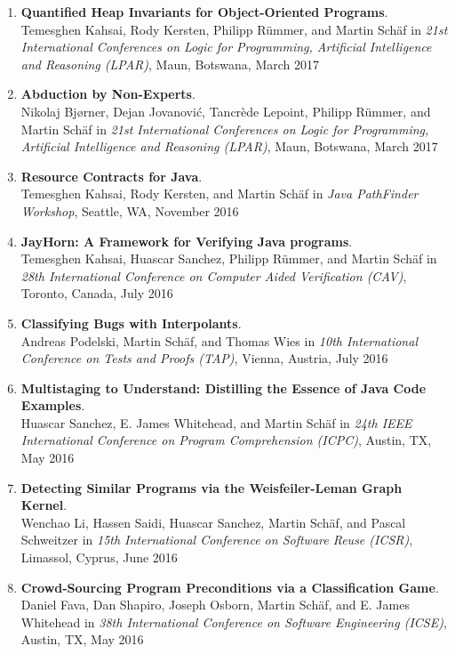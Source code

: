 \begin{enumerate}
\item \textbf{Quantified Heap Invariants for Object-Oriented Programs}.
\\ Temesghen Kahsai, Rody Kersten, Philipp R\"ummer, and Martin Sch\"af in 
\emph{21st International Conferences on Logic for Programming, Artificial Intelligence and Reasoning (LPAR)},
Maun, Botswana, March 2017

\item \textbf{Abduction by Non-Experts}.
\\ Nikolaj Bj{\o}rner, Dejan Jovanovi\'c, Tancr\`ede Lepoint, Philipp R\"ummer, and Martin Sch\"af in 
\emph{21st International Conferences on Logic for Programming, Artificial Intelligence and Reasoning (LPAR)},
Maun, Botswana, March 2017


\item \textbf{Resource Contracts for Java}.
\\ Temesghen Kahsai, Rody Kersten, and Martin Sch\"af in 
\emph{Java PathFinder Workshop},
Seattle, WA, November 2016

\item \textbf{JayHorn: A Framework for Verifying Java programs}.
\\ Temesghen Kahsai, Huascar Sanchez, Philipp R\"ummer, and Martin Sch\"af in 
\emph{28th International Conference on Computer Aided Verification (CAV)},
Toronto, Canada, July 2016


\item \textbf{Classifying Bugs with Interpolants}.
\\ Andreas Podelski, Martin Sch\"af, and Thomas Wies in 
\emph{10th International Conference on Tests and Proofs (TAP)},
Vienna, Austria, July 2016


\item \textbf{Multistaging to Understand: Distilling the Essence of Java Code Examples}.
\\ Huascar Sanchez, E. James Whitehead, and Martin Sch\"af in 
\emph{24th IEEE International Conference on Program Comprehension (ICPC)},
Austin, TX, May 2016


\item \textbf{Detecting Similar Programs via the Weisfeiler-Leman Graph Kernel}.
\\ Wenchao Li, Hassen Saidi, Huascar Sanchez, Martin Sch\"af, and Pascal
Schweitzer in \emph{15th International Conference on Software Reuse (ICSR)},
Limassol, Cyprus, June 2016


\item \textbf{Crowd-Sourcing Program Preconditions via a Classification Game}.
\\ Daniel Fava, Dan Shapiro, Joseph Osborn, Martin Sch\"af, and E. James
Whitehead in \emph{38th International Conference on Software Engineering (ICSE)}, Austin,
TX, May 2016



\end{enumerate}
